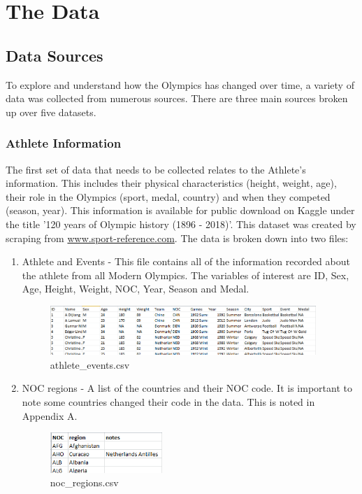 \documentclass[a4 paper, 12pt]{article}
\begin{document}
\section{The Data}

\subsection{Data Sources}
    To explore and understand how the Olympics has changed over time, a variety of data was collected from numerous sources. There are three main sources broken up over five datasets. 

    \subsubsection{Athlete Information}
    The first set of data that needs to be collected relates to the Athlete's information. This includes their physical characteristics (height, weight, age), their role in the Olympics (sport, medal, country) and when they competed (season, year). This information is available for public download on Kaggle under the title '120 years of Olympic history (1896 - 2018)'. This dataset was created by scraping from \url{www.sport-reference.com}. The data is broken down into two files:

        \begin{enumerate}
            \item Athlete and Events - This file contains all of the information recorded about the athlete from all Modern Olympics. The variables of interest are ID, Sex, Age, Height, Weight, NOC, Year, Season and Medal. 
                \begin{figure} [H]
                    \centering
                    \includegraphics[width=0.95\textwidth, frame]
                        {./images/data/athlete_events.png} 
                    \caption{athlete\_events.csv}                  
                \end{figure}            
            \item NOC regions - A list of the countries and their NOC code. It is important to note some countries changed their code in the data. This is noted in Appendix A. 
                \begin{figure}[H]
                    \centering
                    \includegraphics[width=0.4\textwidth, frame]
                    {./images/data/noc_regions.png}   
                    \caption{noc\_regions.csv}                 
            \end{figure}
        \end{enumerate}
\end{document}
